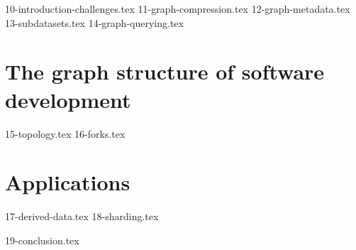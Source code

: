 \documentclass[a4paper,11pt,openbib,draft]{memoir}
\begin{document}
{10-introduction-challenges.tex}
{11-graph-compression.tex}
{12-graph-metadata.tex}
{13-subdatasets.tex}
{14-graph-querying.tex}

\part{The graph structure of software development}

{15-topology.tex}
{16-forks.tex}

\part{Applications}

{17-derived-data.tex}
{18-sharding.tex}

{19-conclusion.tex}
\fi



%
%
\iffalse
\appendix
\clearemptydoublepage
\fi


%
\backmatter






\clearemptydoublepage
\newpage
\thispagestyle{empty}
\vspace*{\fill}


%
%
\end{document}
